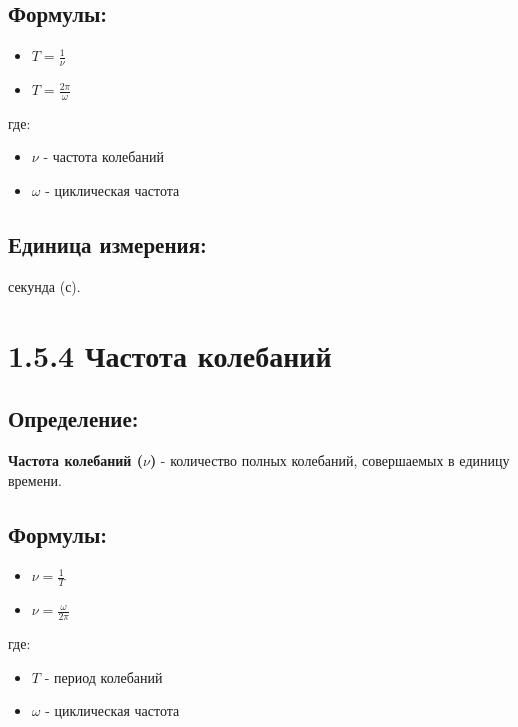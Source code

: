 \documentclass[a4paper,12pt]{article}
\begin{document}
\vspace{-9pt}
\subsection*{Формулы:}
\vspace{-3pt}
\begin{itemize}[itemsep=0pt, topsep=0pt, parsep=0pt]
    \item $T = \frac{1}{\nu}$
    \item $T = \frac{2\pi}{\omega}$
\end{itemize}
где:
\begin{itemize}
    \item $\nu$ - частота колебаний
    \item $\omega$ - циклическая частота
\end{itemize}

\vspace{-9pt}
\subsection*{Единица измерения:}
\vspace{-3pt}
секунда (с).

\section*{1.5.4 Частота колебаний}

\vspace{-9pt}
\subsection*{Определение:}
\vspace{-3pt}
\textbf{Частота колебаний ($\nu$)} - количество полных колебаний, совершаемых в единицу времени.

\vspace{-9pt}
\subsection*{Формулы:}
\vspace{-3pt}
\begin{itemize}[itemsep=0pt, topsep=0pt, parsep=0pt]
    \item $\nu = \frac{1}{T}$
    \item $\nu = \frac{\omega}{2\pi}$
\end{itemize}
где:
\begin{itemize}
    \item $T$ - период колебаний
    \item $\omega$ - циклическая частота
\end{itemize}
\end{document}
